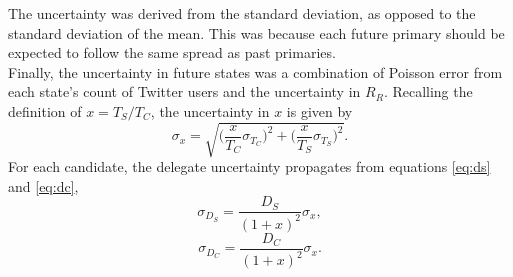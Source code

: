 \documentclass[12pt]{extarticle}
\begin{document}
The uncertainty was derived from the standard deviation, as opposed to the standard deviation of the mean.
This was because each future primary should be expected to follow the same spread as past primaries.
\\
\indent
Finally, the uncertainty in future states was a combination of Poisson error from each state's count of Twitter users and the uncertainty in $R_R$.
Recalling the definition of $x = T_S / T_C$, the uncertainty in $x$ is given by
\begin{equation}
	\sigma_x = \sqrt{\Big(\frac{x}{T_C} \sigma_{T_C}\Big)^2 + \Big(\frac{x}{T_S} \sigma_{T_S}\Big)^2}.
\end{equation}
For each candidate, the delegate uncertainty propagates from equations \ref{eq:ds} and \ref{eq:dc},
\begin{equation}
	\sigma_{D_S} = \frac{D_S}{(1+x)^2} \sigma_x,
\end{equation}
\begin{equation}
	\sigma_{D_C} = \frac{D_C}{(1+x)^2} \sigma_x.
\end{equation}
\end{document}
